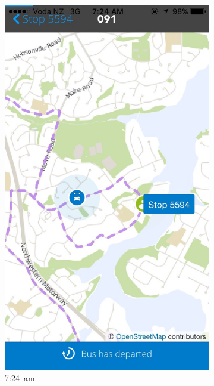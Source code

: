 \documentclass[12pt,a4paper]{article}
\begin{document}
\begin{figure}[!b]
  \centering
  \begin{subfigure}{0.4\textwidth}
    \includegraphics[width=\textwidth,trim={0 0 0 15cm},clip]{bus-loop-durp1.jpg}
    \caption{7:24~am}
    \label{fig:colwill-loop-1}
  \end{subfigure}
  ~
  \begin{subfigure}{0.4\textwidth}

\end{subfigure}
\end{figure}
\end{document}
